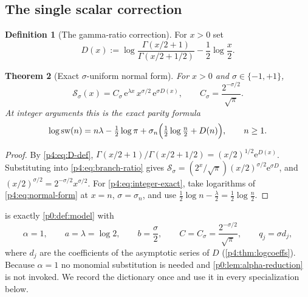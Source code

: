 \documentclass[11pt,a4paper,oneside]{book}
\theoremstyle{plain}
\newtheorem{theorem}{Theorem}[chapter]
\theoremstyle{definition}
\newtheorem{definition}[theorem]{Definition}
\theoremstyle{remark}
\newcommand{\e}{\mathrm{e}}
\begin{document}
\subsection{The single scalar correction}

\begin{definition}[The gamma-ratio correction]
\label{p4:def:D}
For $x>0$ set
\begin{equation}
  D(x):=\log\frac{\Gamma(x/2+1)}{\Gamma(x/2+1/2)}-\frac12\log\frac x2 .
  \label{p4:eq:D-def}
\end{equation}
\end{definition}

\begin{theorem}[Exact $\sigma$-uniform normal form]
\label{p4:thm:normal-form}
For $x>0$ and $\sigma\in\{-1,+1\}$,
\begin{equation}
  \boxed{\;
  \mathcal S_\sigma(x)=C_\sigma\,\e^{\lambda x}\,x^{\sigma/2}\,
  \e^{\sigma D(x)},
  \qquad
  C_\sigma=\frac{2^{-\sigma/2}}{\sqrt\pi}.\;}
  \label{p4:eq:normal-form}
\end{equation}
At integer arguments this is the exact parity formula
\begin{equation}
  \log\operatorname{sw}(n)
  =n\lambda-\tfrac12\log\pi
  +\sigma_n\Bigl(\tfrac12\log\tfrac n2+D(n)\Bigr),
  \qquad n\ge1 .
  \label{p4:eq:integer-exact}
\end{equation}
\end{theorem}

\begin{proof}
By \cref{p4:eq:D-def}, $\Gamma(x/2+1)/\Gamma(x/2+1/2)=(x/2)^{1/2}\e^{D(x)}$.
Substituting into \cref{p4:eq:branch-ratio} gives
$\mathcal S_\sigma=(2^x/\sqrt\pi)(x/2)^{\sigma/2}\e^{\sigma D}$, and
$(x/2)^{\sigma/2}=2^{-\sigma/2}x^{\sigma/2}$.  For
\cref{p4:eq:integer-exact}, take logarithms of \cref{p4:eq:normal-form} at
$x=n$, $\sigma=\sigma_n$, and use
$\tfrac12\log n-\tfrac\lambda2=\tfrac12\log\tfrac n2$.
\end{proof}

 is exactly \cref{p0:def:model} with
\begin{equation}
  \boxed{\;
  \alpha=1,\qquad a=\lambda=\log 2,\qquad b=\frac\sigma2,\qquad
  C=C_\sigma=\frac{2^{-\sigma/2}}{\sqrt\pi},\qquad
  q_j=\sigma d_j,\;}
  \label{p4:eq:dictionary}
\end{equation}
where $d_j$ are the coefficients of the asymptotic series of $D$
(\cref{p4:thm:logcoeffs}).  Because $\alpha=1$ no monomial substitution is
needed and \cref{p0:lem:alpha-reduction} is not invoked.  We record the
dictionary once and use it in every specialization below.
\end{document}
